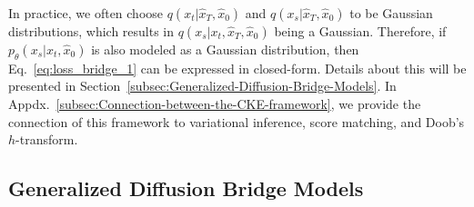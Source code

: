In practice, we often choose $q\left(x_{t}|\hat{x}_{T},\hat{x}_{0}\right)$
and $q\left(x_{s}|\hat{x}_{T},\hat{x}_{0}\right)$ to be Gaussian
distributions, which results in $q\left(x_{s}|x_{t},\hat{x}_{T},\hat{x}_{0}\right)$
being a Gaussian. Therefore, if $p_{\theta}\left(x_{s}|x_{t},\hat{x}_{0}\right)$
is also modeled as a Gaussian distribution, then Eq.~\ref{eq:loss_bridge_1}
can be expressed in closed-form. Details about this will be presented
in Section~\ref{subsec:Generalized-Diffusion-Bridge-Models}. In
Appdx.~\ref{subsec:Connection-between-the-CKE-framework}, we provide
the connection of this framework to variational inference, score matching,
and Doob's $h$-transform.

\subsection{Generalized Diffusion Bridge Models\label{subsec:Generalized-Diffusion-Bridge-Models}}

